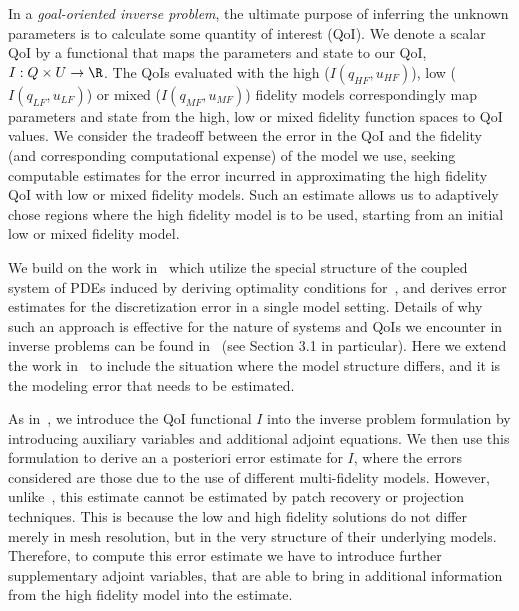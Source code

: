 In a {\em goal-oriented inverse problem}, the ultimate purpose of inferring the unknown parameters is to calculate some quantity of interest (QoI). We denote a scalar QoI by a functional that maps the parameters and state to our QoI, $I:Q \times U \to \R$. The QoIs evaluated with the high ($I(q_{HF},u_{HF})$), low ($I(q_{LF},u_{LF})$) or mixed ($I(q_{MF},u_{MF})$) fidelity models correspondingly map parameters and state from the high, low or mixed fidelity function spaces to QoI values. We consider the tradeoff between the error in the QoI and the fidelity (and corresponding computational expense) of the model we use, seeking computable estimates for the error incurred in approximating the high fidelity QoI with low or mixed fidelity models. Such an estimate allows us to adaptively chose regions where the high fidelity model is to be used, starting from an initial low or mixed fidelity model.

We build on the work in~\cite{BecVex05, becker2004posteriori} which utilize the special structure of the coupled system of PDEs induced by deriving optimality conditions for~, and derives error estimates for the discretization error in a single model setting. Details of why such an approach is effective for the nature of systems and QoIs we encounter in inverse problems can be found in~\cite{becker2004posteriori} (see Section 3.1 in particular). Here we extend the work in~\cite{BecVex05} to include the situation where the model structure differs, and it is the modeling error that needs to be estimated.

As in~\cite{BecVex05}, we introduce the QoI functional $I$ into the inverse problem formulation by introducing auxiliary variables and additional adjoint equations. We then use this formulation to derive an a posteriori error estimate for $I$, where the errors considered are those due to the use of different multi-fidelity models. However, unlike~\cite{BecVex05}, this estimate cannot be estimated by patch recovery or projection techniques. This is because the low and high fidelity solutions do not differ merely in mesh resolution, but in the very structure of their underlying models. Therefore, to compute this error estimate we have to introduce further supplementary adjoint variables, that are able to bring in additional information from the high fidelity model into the estimate.

%
